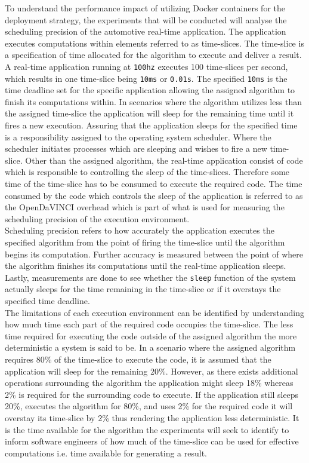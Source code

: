 To understand the performance impact of utilizing Docker containers for the deployment strategy, the experiments that will be conducted will analyse the scheduling precision of the automotive real-time application. The application executes computations within elements referred to as time-slices. The time-slice is a specification of time allocated for the algorithm to execute and deliver a result. A real-time application running at \texttt{100hz} executes 100 time-slices per second, which results in one time-slice being \texttt{10ms} or \texttt{0.01s}. The specified \texttt{10ms} is the time deadline set for the specific application allowing the assigned algorithm to finish its computations within. In scenarios where the algorithm utilizes less than the assigned time-slice the application will sleep for the remaining time until it fires a new execution. Assuring that the application sleeps for the specified time is a responsibility assigned to the operating system scheduler. Where the scheduler initiates processes which are sleeping and wishes to fire a new time-slice. Other than the assigned algorithm, the real-time application consist of code which is responsible to controlling the sleep of the time-slices. Therefore some time of the time-slice has to be consumed to execute the required code. The time consumed by the code which controls the sleep of the application is referred to as the OpenDaVINCI overhead which is part of what is used for measuring the scheduling precision of the execution environment.\\

Scheduling precision refers to how accurately the application executes the specified algorithm from the point of firing the time-slice until the algorithm begins its computation. Further accuracy is measured between the point of where the algorithm finishes its computations until the real-time application sleeps. Lastly, measurements are done to see whether the \texttt{sleep} function of the system actually sleeps for the time remaining in the time-slice or if it overstays the specified time deadline.\\

The limitations of each execution environment can be identified by understanding how much time each part of the required code occupies the time-slice. The less time required for executing the code outside of the assigned algorithm the more deterministic a system is said to be. In a scenario where the assigned algorithm requires 80\% of the time-slice to execute the code, it is assumed that the application will sleep for the remaining 20\%. However, as there exists additional operations surrounding the algorithm the application might sleep 18\% whereas 2\% is required for the surrounding code to execute. If the application still sleeps 20\%, executes the algorithm for 80\%, and uses 2\% for the required code it will overstay its time-slice by 2\% thus rendering the application less deterministic. It is the time available for the algorithm the experiments will seek to identify to inform software engineers of how much of the time-slice can be used for effective computations i.e. time available for generating a result.\\

